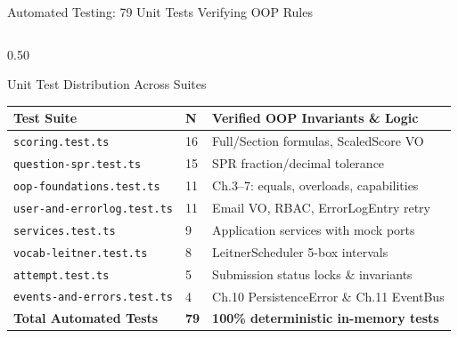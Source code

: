 ﻿\documentclass[aspectratio=169,10pt,t]{beamer}
\begin{document}
\begin{frame}{Automated Testing: 79 Unit Tests Verifying OOP Rules}
  \vspace{0.3mm}
  \begin{columns}[T,onlytextwidth]
    \begin{column}{0.50\textwidth}
      \begin{infoCard}{Unit Test Distribution Across Suites}
        \setlength{\tabcolsep}{1.5pt}
        \fontsize{5.0pt}{6.0pt}\selectfont
        \renewcommand{\arraystretch}{1.00}
        \begin{tabular}{@{}p{24mm}p{4mm}p{30mm}@{}}
          \toprule
          \textbf{Test Suite} & \textbf{N} & \textbf{Verified OOP Invariants \& Logic} \\
          \midrule
          \texttt{scoring.test.ts} & 16 & Full/Section formulas, ScaledScore VO \\
          \texttt{question-spr.test.ts} & 15 & SPR fraction/decimal tolerance \\
          \texttt{oop-foundations.test.ts} & 11 & Ch.3--7: equals, overloads, capabilities \\
          \texttt{user-and-errorlog.test.ts} & 11 & Email VO, RBAC, ErrorLogEntry retry \\
          \texttt{services.test.ts} & 9 & Application services with mock ports \\
          \texttt{vocab-leitner.test.ts} & 8 & LeitnerScheduler 5-box intervals \\
          \texttt{attempt.test.ts} & 5 & Submission status locks \& invariants \\
          \texttt{events-and-errors.test.ts} & 4 & Ch.10 PersistenceError \& Ch.11 EventBus \\
          \midrule
          \textbf{Total Automated Tests} & \textbf{79} & \textbf{100\% deterministic in-memory tests} \\
          \bottomrule
        \end{tabular}
      \end{infoCard}
    \end{column}


\end{columns}
\end{frame}
\end{document}
